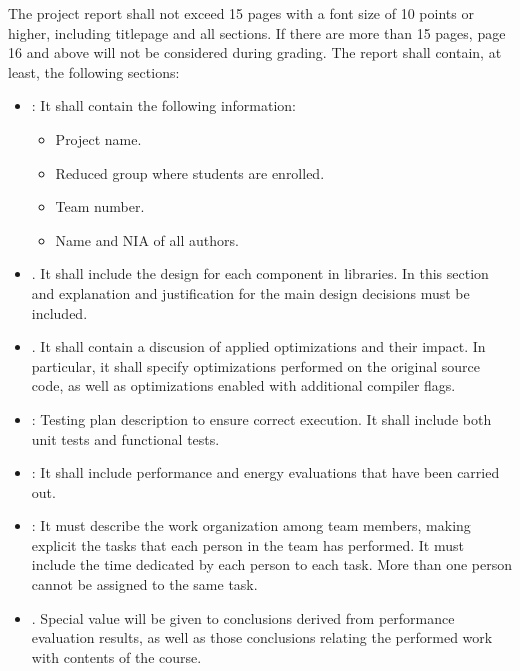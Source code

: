 The project report shall not exceed 15 pages with a font size of 10 points
or higher, including titlepage and all sections. If there are more than
15 pages, page 16 and above will not be considered during grading.
The report shall contain, at least, the following sections:

\begin{itemize}

\item {}: It shall contain the following information:
  \begin{itemize}
    \item Project name.
    \item Reduced group where students are enrolled.
    \item Team number.
    \item Name and NIA of all authors.
  \end{itemize}

\item {}. 
      It shall include the design for each component in libraries.
      In this section and explanation and justification for the main
      design decisions must be included.

\item {}. 
      It shall contain a discusion of applied optimizations and their
      impact. In particular, it shall specify optimizations performed
      on the original source code, as well as optimizations enabled
      with additional compiler flags.

\item {}: 
      Testing plan description to ensure correct execution.
      It shall include both unit tests and functional tests.

\item {}:
      It shall include performance and energy evaluations that have been
      carried out.

\item {}:
      It must describe the work organization among team members, 
      making explicit the tasks that each person in the team has performed.
      It must include the time dedicated by each person to each task.
      More than one person cannot be assigned to the same task.

\item {}.
      Special value will be given to conclusions derived from performance evaluation
      results, as well as those conclusions relating the performed work with
      contents of the course.

\end{itemize}

